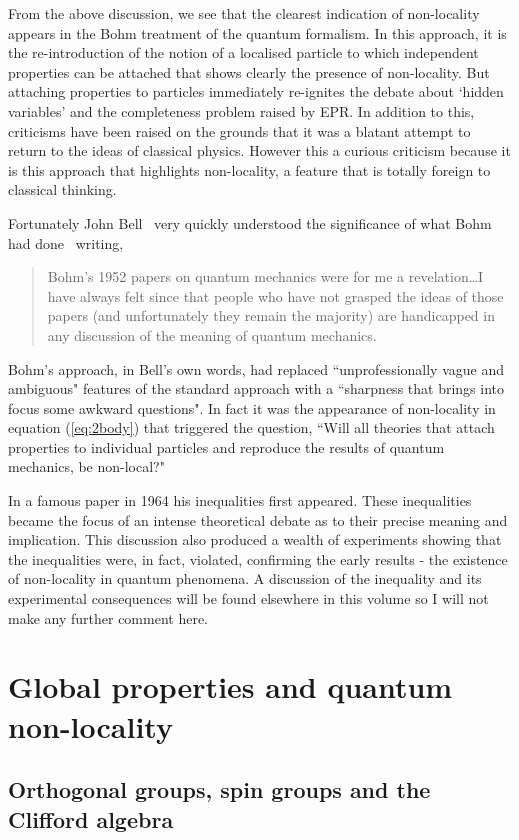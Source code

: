 \documentclass[11pt]{article}
\begin{document}
From the above discussion, we see that the clearest indication of non-locality appears in the Bohm treatment of the quantum formalism.  In this approach, it is the re-introduction of the notion of a localised particle to which independent properties can be attached that shows clearly the presence of non-locality.  But attaching properties to particles immediately re-ignites the debate about `hidden variables' and the completeness problem raised by EPR.  In addition to this, criticisms have been raised on the grounds that it was a blatant attempt to return to the ideas of classical physics.  However this a curious criticism because it is this approach that highlights  non-locality, a feature that is totally foreign to classical thinking.

Fortunately John Bell~\cite{jb87} 
very quickly understood the significance of what Bohm had done~\cite{db52} writing,
\begin{quote}
Bohm's 1952 papers on quantum mechanics were for me a revelation\dots I have always felt since that people who have not grasped the ideas of those papers (and unfortunately they remain the majority) are handicapped in any discussion of the meaning of quantum mechanics.
\end{quote}
Bohm's approach, in Bell's own words, had replaced  ``unprofessionally vague and ambiguous" features of the standard approach with a ``sharpness that brings into focus some awkward questions".  In fact it was the appearance of non-locality in equation (\ref{eq:2body}) that triggered the question,  ``Will all theories that attach properties to individual particles and reproduce the results of quantum mechanics, be non-local?"

In a famous paper in 1964 his inequalities first appeared. These inequalities became  the focus of an intense theoretical debate as to their precise meaning and implication.  This discussion also produced a wealth of experiments showing that the inequalities were, in fact, violated, confirming the early results - the existence of non-locality in quantum phenomena.  A discussion of the inequality and its experimental consequences will be found elsewhere in this volume so I will not make any further comment here. 
 
 \section{Global properties and quantum non-locality}
 
 \subsection{Orthogonal groups, spin groups and the Clifford algebra}
\end{document}
